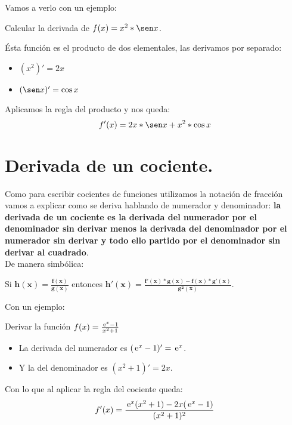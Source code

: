 \documentclass[a4paper,11pt,answers]{exam}
\begin{document}
Vamos a verlo con un ejemplo:
\begin{questions}
\question Calcular la derivada de $f(x) = x^2 * \sen x$.
\begin{solution}
Ésta función es el producto de dos elementales, las derivamos por separado:
\begin{itemize}
	\item $(x^2)' = 2x$
	\item $(\sen x)' = \cos x$
\end{itemize}

Aplicamos la regla del producto y nos queda:
\[f'(x) = 2x*\sen x + x^2 *\cos x\]
\end{solution}
\end{questions}

\section{Derivada de un cociente.}
Como para escribir cocientes de funciones utilizamos la notación de fracción vamos a explicar como se deriva hablando de numerador y denominador: \textbf{la derivada de un cociente es la derivada del numerador por el denominador sin derivar menos la derivada del denominador por el numerador sin derivar y todo ello partido por el denominador sin derivar al cuadrado}.\\
De manera simbólica:
\begin{center}
Si $\boldsymbol{h(x) = \frac{f(x)}{g(x)}}$ entonces $\boldsymbol{h'(x) = \frac{f'(x)*g(x) - f(x)*g'(x)}{g^2(x)}}$.
\end{center}

Con un ejemplo:
\begin{questions}
\question Derivar la función $f(x) = \frac{\,\mathrm{e}^x - 1}{x^2 + 1}$
\begin{solution}
\begin{itemize}
	\item La derivada del numerador es $(\,\mathrm{e}^x -1)' = \,\mathrm{e}^x$.
	\item Y la del denominador es $(x^2 + 1)' = 2x$.
\end{itemize}
Con lo que al aplicar la regla del cociente queda:
\[f'(x) = \frac{\,\mathrm{e}^x (x^2+ 1) - 2x(\,\mathrm{e}^x-1)}{(x^2 + 1)^2}\]
\end{solution}
\end{questions}
\end{document}

